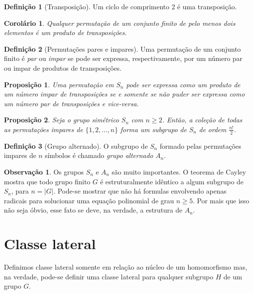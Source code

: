 \documentclass[a4paper,12pt]{report}
\theoremstyle{plain}
\newtheorem{proposicao}{Proposição}[section]
\newtheorem{corolario}{Corolário}[section]
\theoremstyle{definition}
\newtheorem{definicao}{Definição}[section]
\newtheorem{observacao}{Observação}[section]
\begin{document}
\begin{definicao}[Transposição]
	Um ciclo de comprimento 2 é uma transposição.
\end{definicao}

\begin{corolario}
	Qualquer permutação de um conjunto finito de pelo menos dois elementos é um produto de transposições.	
\end{corolario}

\begin{definicao}[Permutações pares e impares]
	Uma permutação de um conjunto finito é \emph{par} ou \emph{impar} se pode ser expressa, respectivamente, por um número par ou impar de produtos de transposições.
\end{definicao}

\begin{proposicao}
	Uma permutação em $S_n$ pode ser expressa como um produto de um número impar de transposições se e somente se não puder ser expressa como um número par de transposições e vice-versa.
\end{proposicao}

\begin{proposicao}
	Seja o grupo simétrico $S_n$ com $n\geq 2$. Então, a coleção de todas as permutações impares de $\{1,2,\dots,n\}$ forma um subgrupo de $S_n$ de ordem $\frac{n!}{2}$.	
\end{proposicao}

\begin{definicao}[Grupo alternado]
	O subgrupo de $S_n$ formado pelas permutações impares de $n$ símbolos é chamado \emph{grupo alternado $A_n$}.
\end{definicao}

\begin{observacao}
	Os grupos $S_n$ e $A_n$ são muito importantes. O teorema de Cayley mostra que todo grupo finito $G$ é estruturalmente idêntico a algum subgrupo de $S_n$, para $n = |G|$. Pode-se mostrar que não há formulas envolvendo apenas radicais para solucionar uma equação polinomial de grau $n\geq 5$. Por mais que isso não seja óbvio, esse fato se deve, na verdade, a estrutura de $A_n$.
\end{observacao}


\section{Classe lateral}

Definimos classe lateral somente em relação ao núcleo de um homomorfismo mas,
na verdade, pode-se definir uma classe lateral para qualquer subgrupo \(H\) de
um grupo \(G\).
\end{document}
